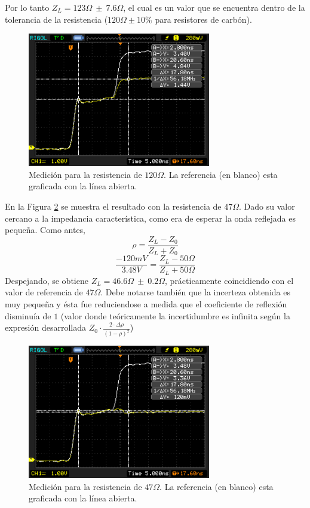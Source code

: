 \documentclass[a4paper,10pt]{article}
\begin{document}
	\indent Por lo tanto $Z_L=123\Omega~\pm~7.6\Omega$, el cual es un valor que se encuentra
	dentro de la tolerancia de la resistencia ($120\Omega \pm 10\%$
	para resistores de carb\'on). 	

		\begin{figure}[!htb]
			\centering
			\includegraphics[width=8cm]
			{Imagenes/Res120.png}
			\caption{Medici\'on para la resistencia de $120\Omega$. La 
			referencia (en blanco) esta graficada con la l\'inea abierta.}
			\label{img003}
		\end{figure}
	
	\indent En la Figura \ref{img004} se muestra el resultado con la 
	resistencia de $47\Omega$. Dado su valor cercano a la impedancia 
	caracter\'istica, como era de esperar la onda reflejada es peque\~na. Como
	antes, $$\rho=\frac{Z_L-Z_0}{Z_L+Z_0}$$
	$$\frac{-120mV}{3.48V}=\frac{Z_L- 50\Omega}{Z_L+50\Omega}$$
	\indent Despejando, se obtiene $Z_L=46.6\Omega~\pm~0.2\Omega$, pr\'acticamente 
	coincidiendo con el valor de referencia de $47\Omega$. Debe notarse tambi\'en que la incerteza obtenida es muy peque\~na y \'esta fue reduciendose a medida que el coeficiente de reflexi\'on disminu\'ia de $1$ (valor donde te\'oricamente la incertidumbre es infinita seg\'un la expresi\'on desarrollada $Z_0\cdot\frac{2\cdot\Delta\rho}
		{(1 - \rho)^2}$)
	
		\begin{figure}[!htb]
			\centering
			\includegraphics[width=8cm]
			{Imagenes/Res47.png}
			\caption{Medici\'on para la resistencia de $47\Omega$. La 
			referencia (en blanco) esta graficada con la l\'inea abierta.}
			\label{img004}
		\end{figure}
\end{document}
